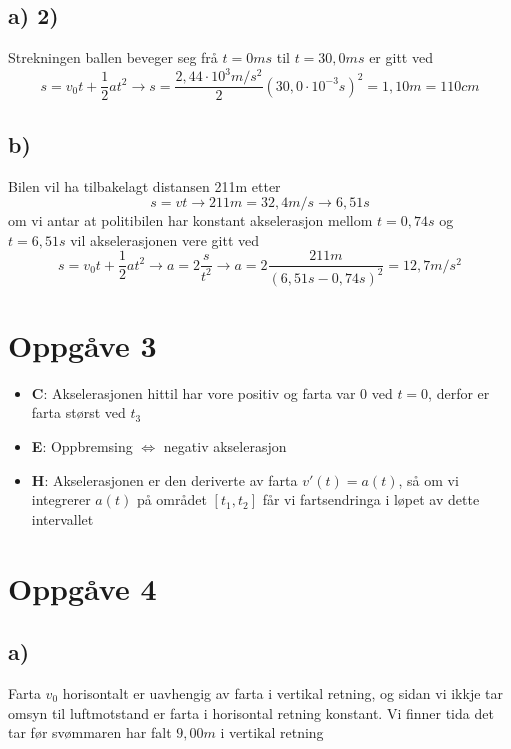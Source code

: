 \documentclass[12pt,a4paper]{article}
\begin{document}
    \subsection*{a) 2)}
      Strekningen ballen beveger seg frå $t = 0ms$ til $t = 30,0ms$ er gitt ved
      \begin{equation}
        s = v_0 t + \frac{1}{2} at^2 \rightarrow
        s = \frac{2,44 \cdot 10^3m/s^2}{2}(30,0\cdot 10^{-3} s)^2 = 1,10m = 110 cm
      \end{equation}

    \subsection*{b)}
      Bilen vil ha tilbakelagt distansen 211m etter
      \begin{equation}
        s = vt \rightarrow 211m = 32,4m/s \rightarrow 6,51s
      \end{equation}
      om vi antar at politibilen har konstant akselerasjon mellom $t=0,74s$ og
      $t=6,51s$ vil akselerasjonen vere gitt ved
      \begin{equation}
        s = v_0t + \frac{1}{2}at^2 \rightarrow a = 2\frac{s}{t^2}
        \rightarrow a = 2\frac{211m}{(6,51s - 0,74s)^2} = 12,7m/s^2
      \end{equation}

  \section*{Oppgåve 3}
    \begin{itemize}
      \item \textbf{C}: Akselerasjonen hittil har vore positiv og farta var 0
        ved $t=0$, derfor er farta størst ved $t_3$
      \item \textbf{E}: Oppbremsing $\Leftrightarrow$ negativ akselerasjon
      \item \textbf{H}: Akselerasjonen er den deriverte av farta $v'(t) = a(t)$, så om
        vi integrerer $a(t)$ på området $[t_1, t_2]$ får vi fartsendringa i løpet av
        dette intervallet
    \end{itemize}

  \section*{Oppgåve 4}
    \subsection*{a)}
      Farta $v_0$ horisontalt er uavhengig av farta i vertikal retning, og sidan vi ikkje
      tar omsyn til luftmotstand er farta i horisontal retning konstant. Vi finner tida
      det tar før svømmaren har falt $9,00m$ i vertikal retning
\end{document}
